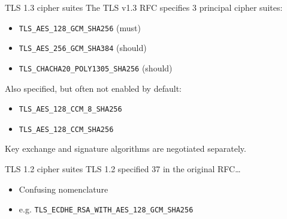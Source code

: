 \begin{frame}{TLS 1.3 cipher suites}
  The TLS v1.3 RFC specifies 3 principal cipher suites:
  \pause
  \begin{itemize}
    \item {\small\texttt{TLS\_AES\_128\_GCM\_SHA256}} (must)
    \item {\small\texttt{TLS\_AES\_256\_GCM\_SHA384}} (should)
    \item {\small\texttt{TLS\_CHACHA20\_POLY1305\_SHA256}} (should)
  \end{itemize}

  \vspace*{1em}

  \pause
  Also specified, but often not enabled by default:
  \begin{itemize}
    \item {\small\texttt{TLS\_AES\_128\_CCM\_8\_SHA256}}
    \item {\small\texttt{TLS\_AES\_128\_CCM\_SHA256}}
  \end{itemize}

  \vspace*{1em}

  \pause
  Key exchange and signature algorithms are negotiated separately.
\end{frame}

\begin{frame}{TLS 1.2 cipher suites}
  TLS 1.2 specified 37 in the original RFC\dots
  \begin{itemize}
    \item Confusing nomenclature
    \item e.g. {\small\texttt{TLS\_ECDHE\_RSA\_WITH\_AES\_128\_GCM\_SHA256}}
  \end{itemize}
\end{frame}

